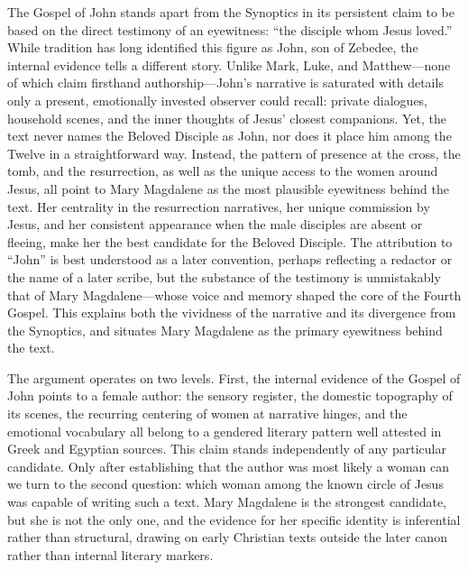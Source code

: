 The Gospel of John stands apart from the Synoptics in its persistent claim to be based on the direct testimony of an eyewitness: ``the disciple whom Jesus loved.'' While tradition has long identified this figure as John, son of Zebedee, the internal evidence tells a different story. Unlike Mark, Luke, and Matthew---none of which claim firsthand authorship---John's narrative is saturated with details only a present, emotionally invested observer could recall: private dialogues, household scenes, and the inner thoughts of Jesus' closest companions. Yet, the text never names the Beloved Disciple as John, nor does it place him among the Twelve in a straightforward way. Instead, the pattern of presence at the cross, the tomb, and the resurrection, as well as the unique access to the women around Jesus, all point to Mary Magdalene as the most plausible eyewitness behind the text. Her centrality in the resurrection narratives, her unique commission by Jesus, and her consistent appearance when the male disciples are absent or fleeing, make her the best candidate for the Beloved Disciple. The attribution to ``John'' is best understood as a later convention, perhaps reflecting a redactor or the name of a later scribe, but the substance of the testimony is unmistakably that of Mary Magdalene---whose voice and memory shaped the core of the Fourth Gospel. This explains both the vividness of the narrative and its divergence from the Synoptics, and situates Mary Magdalene as the primary eyewitness behind the text.

The argument operates on two levels.
First, the internal evidence of the Gospel of John points to a female author: the sensory register, the domestic topography of its scenes, the recurring centering of women at narrative hinges, and the emotional vocabulary all belong to a gendered literary pattern well attested in Greek and Egyptian sources.
This claim stands independently of any particular candidate.
Only after establishing that the author was most likely a woman can we turn to the second question: which woman among the known circle of Jesus was capable of writing such a text.
Mary Magdalene is the strongest candidate, but she is not the only one, and the evidence for her specific identity is inferential rather than structural, drawing on early Christian texts outside the later canon rather than internal literary markers.

